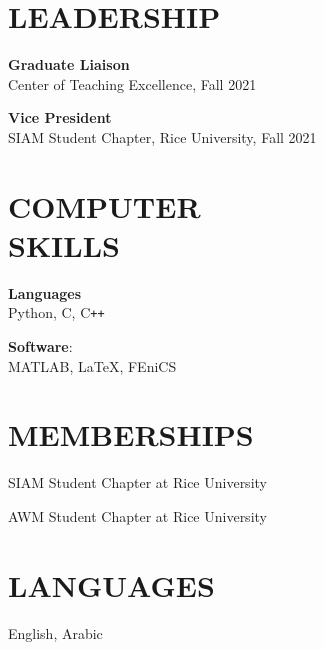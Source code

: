 \documentclass[margin]{res}
\begin{document}
\begin{resume}
\section{LEADERSHIP} \textbf{Graduate Liaison}\\
Center of Teaching Excellence, Fall 2021   
\par \textbf{Vice President} \\
SIAM Student Chapter, Rice University, Fall 2021 


\section{COMPUTER\\SKILLS}

\textbf{Languages} \\ 
Python, C, C\texttt{++} 
\par 
\textbf{Software}: \\ MATLAB, \LaTeX, FEniCS


\section{MEMBERSHIPS}

\par
SIAM Student Chapter at Rice University \par 

AWM Student Chapter at Rice University
\section{LANGUAGES} 
English,  Arabic 


\end{resume}
\end{document}
